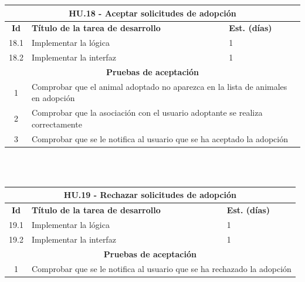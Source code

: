 \begin{tabular}{|c|p{9.5cm}|p{1cm}|}
	\hline
	\multicolumn{3}{|c|}{\textbf{HU.18 - Aceptar solicitudes de adopción}} \\
	\hline
	\textbf{Id} & \textbf{Título de la tarea de desarrollo} & \textbf{Est. (días)} \\
	\hline
	18.1 &  Implementar la lógica & 1 \\ \hline
	18.2 &  Implementar la interfaz & 1 \\ \hline
	\multicolumn{3}{|c|}{\textbf{Pruebas de aceptación}} \\ \hline
	1 & \multicolumn{2}{|p{12cm}|}{Comprobar que el animal adoptado no aparezca en la lista de animales en adopción} \\ \hline
	2 & \multicolumn{2}{|p{12cm}|}{Comprobar que la asociación con el usuario adoptante se realiza correctamente} \\ \hline
	3 & \multicolumn{2}{|p{12cm}|}{Comprobar que se le notifica al usuario que se ha aceptado la adopción} \\ \hline

	
\end{tabular} \\ \\

\begin{tabular}{|c|p{9.5cm}|p{1cm}|}
	\hline
	\multicolumn{3}{|c|}{\textbf{HU.19 - Rechazar solicitudes de adopción}} \\
	\hline
	\textbf{Id} & \textbf{Título de la tarea de desarrollo} & \textbf{Est. (días)} \\
	\hline
	19.1 &  Implementar la lógica & 1 \\ \hline
	19.2 &  Implementar la interfaz & 1 \\ \hline
	\multicolumn{3}{|c|}{\textbf{Pruebas de aceptación}} \\ \hline
	1 & \multicolumn{2}{|p{12cm}|}{Comprobar que se le notifica al usuario que se ha rechazado la adopción} \\ \hline
	
	
\end{tabular} \\ \\


